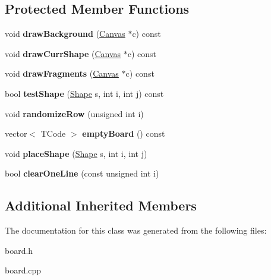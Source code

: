 \subsection*{Protected Member Functions}
\begin{DoxyCompactItemize}
\item 
\hypertarget{class_tetris_1_1_board_a4419e7a6fb6393bf70c7f4408bb12788}{void {\bfseries draw\-Background} (\hyperlink{class_k_graph_1_1_canvas}{Canvas} $\ast$c) const }\label{class_tetris_1_1_board_a4419e7a6fb6393bf70c7f4408bb12788}

\item 
\hypertarget{class_tetris_1_1_board_ac56f1e62be8ed638f8db44b38cb6f461}{void {\bfseries draw\-Curr\-Shape} (\hyperlink{class_k_graph_1_1_canvas}{Canvas} $\ast$c) const }\label{class_tetris_1_1_board_ac56f1e62be8ed638f8db44b38cb6f461}

\item 
\hypertarget{class_tetris_1_1_board_ac3ef5641939942570f4a3af634580787}{void {\bfseries draw\-Fragments} (\hyperlink{class_k_graph_1_1_canvas}{Canvas} $\ast$c) const }\label{class_tetris_1_1_board_ac3ef5641939942570f4a3af634580787}

\item 
\hypertarget{class_tetris_1_1_board_ab3709642b6353b7be37d12ed269700fa}{bool {\bfseries test\-Shape} (\hyperlink{class_tetris_1_1_shape}{Shape} s, int i, int j) const }\label{class_tetris_1_1_board_ab3709642b6353b7be37d12ed269700fa}

\item 
\hypertarget{class_tetris_1_1_board_a6a56a0feb6b93238cf6aa1de607ccafd}{void {\bfseries randomize\-Row} (unsigned int i)}\label{class_tetris_1_1_board_a6a56a0feb6b93238cf6aa1de607ccafd}

\item 
\hypertarget{class_tetris_1_1_board_a062ead1d4baae81c85199e0975496717}{vector$<$ T\-Code $>$ {\bfseries empty\-Board} () const }\label{class_tetris_1_1_board_a062ead1d4baae81c85199e0975496717}

\item 
\hypertarget{class_tetris_1_1_board_a1f79463c8f6cfbc45645ea2f33af9760}{void {\bfseries place\-Shape} (\hyperlink{class_tetris_1_1_shape}{Shape} s, int i, int j)}\label{class_tetris_1_1_board_a1f79463c8f6cfbc45645ea2f33af9760}

\item 
\hypertarget{class_tetris_1_1_board_a3fd98c37754dd14b9068716f10661b07}{bool {\bfseries clear\-One\-Line} (const unsigned int i)}\label{class_tetris_1_1_board_a3fd98c37754dd14b9068716f10661b07}

\end{DoxyCompactItemize}
\subsection*{Additional Inherited Members}


The documentation for this class was generated from the following files\-:\begin{DoxyCompactItemize}
\item 
board.\-h\item 
board.\-cpp\end{DoxyCompactItemize}
